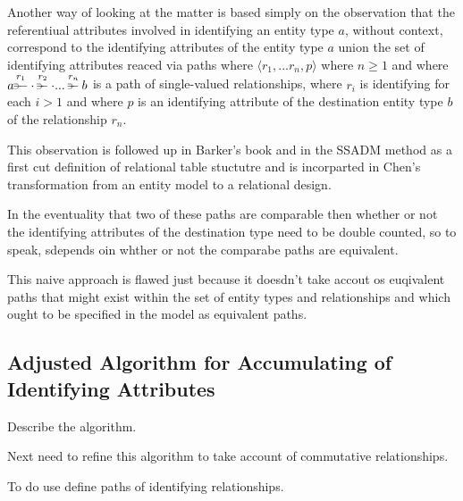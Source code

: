 \mynote
 Another way of looking at the matter is based simply on the observation that the referentiual attributes involved in identifying an entity  type $a$, without
 context,  correspond to the identifying attributes of the entity type $a$ union the set of identifying attributes reaced 
 via paths 
 where  $\langle r_1,...r_n, p \rangle$ where $n \geq 1$ and where
$\overset{r_1}{a \rightpitchfork \hspace{-0.35em} -  \cdot} \overset{r_2}{\rightpitchfork \hspace{-0.35em} -} \cdot ... \overset{r_n}{\rightpitchfork \hspace{-0.35em} -} b$ is a path of single-valued relationships, where 
$r_i$ is identifying for each $i > 1$ and where $p$ is an identifying attribute of the destination entity type $b$ of the
relationship $r_n$. 

This observation is followed up in Barker's book and in the SSADM method as a first cut definition of relational table stuctutre and is incorparted in Chen's transformation from an entity model to a relational design.


In the eventuality that two of these paths are comparable then whether or not the identifying attributes of the destination type need to be double counted, so to speak,
sdepends oin whther or not the comparabe paths are equivalent.

This naive approach is flawed just because it doesdn't take accout os euqivalent paths that might exist within the set of entity types and relationships and which ought to be specified in the model as equivalent paths.


\subsection{Adjusted Algorithm for Accumulating of Identifying Attributes}

Describe the algorithm.

Next need to refine this algorithm to take account of commutative relationships. 

To do use define paths of identifying relationships.
